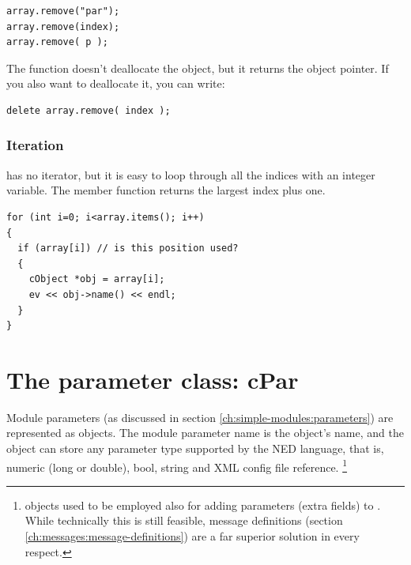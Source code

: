 \begin{verbatim}
array.remove("par");
array.remove(index);
array.remove( p );
\end{verbatim}


The  function doesn't deallocate the object, but it
returns the object pointer. If you also want to deallocate it, you can
write:

\begin{verbatim}
delete array.remove( index );
\end{verbatim}

\subsubsection{Iteration}


 has no iterator, but it is easy to loop through all the
indices with an integer variable. The  member function
returns the largest index plus one.

\begin{verbatim}
for (int i=0; i<array.items(); i++)
{
  if (array[i]) // is this position used?
  {
    cObject *obj = array[i];
    ev << obj->name() << endl;
  }
}
\end{verbatim}


%
%
%
%




\section{The parameter class: cPar}
\label{sec:ch-sim-lib:cpar}

Module parameters (as discussed in section \ref{ch:simple-modules:parameters})
are represented as  objects.
The module parameter name is the  object's name, and the object
can store any parameter type supported by the NED language, that is,
numeric (long or double), bool, string and XML config file reference.
    \footnote{ objects used to be employed also for adding
    parameters (extra fields) to . While technically this is
    still feasible, message definitions (section \ref{ch:messages:message-definitions})
    are a far superior solution in every respect.}

